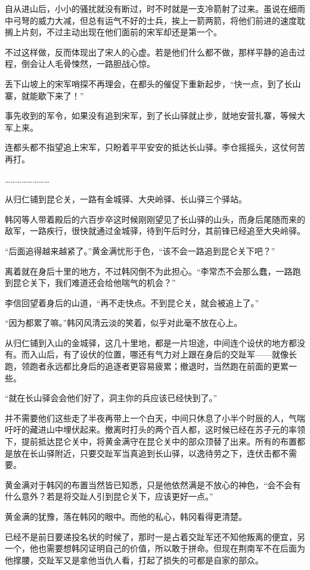 自从进山后，小小的骚扰就没有断过，时不时就是一支冷箭射了过来。虽说在细雨中弓弩的威力大减，但总有运气不好的士兵，挨上一箭两箭，将他们前进的速度耽搁上片刻，不过主动出现在他们面前的宋军却还是第一个。

不过这样做，反而体现出了宋人的心虚。若是他们什么都不做，那样平静的追击过程，倒会让人毛骨悚然，一路胆战心惊。

丢下山坡上的宋军哨探不再理会，在都头的催促下重新起步，“快一点，到了长山寨，就能歇下来了！”

事先收到的军令，如果没有追到宋军，到了长山驿就止步，就地安营扎寨，等候大军上来。

连都头都不指望追上宋军，只盼着平平安安的抵达长山驿。李仓摇摇头，这仗何苦再打。

……………………

从归仁铺到昆仑关，一路有金城驿、大央岭驿、长山驿三个驿站。

韩冈等人带着殿后的六百步卒这时候刚刚望见了长山驿的山头，而身后尾随而来的敌军，一路疾行，很快就通过金城驿，待到午后时分，其前锋已经追至大央岭驿。

“后面追得越来越紧了。”黄金满忧形于色，“该不会一路追到昆仑关下吧？”

离着就在身后十里的地方，不过韩冈倒不为此担心。“李常杰不会那么蠢，一路跑到昆仑关下，我们难道还会给他喘气的机会？”

李信回望着身后的山道，“再不走快点。不到昆仑关，就会被追上了。”

“因为都累了嘛。”韩冈风清云淡的笑着，似乎对此毫不放在心上。

从归仁铺到入山的金城驿，这几十里地，都是一片坦途，中间连个设伏的地方都没有。而入山后，有了设伏的位置，哪还有气力对上跟在身后的交趾军——就像长跑，领跑者永远都比身后的追逐者更容易疲累；撤退时，当然跑在前面的更累一些。

“就在长山驿会会他们好了，洞主你的兵应该已经快到了。”

并不需要他们这些走了半夜再带上一个白天，中间只休息了小半个时辰的人，气喘吁吁的藏进山中埋伏起来。撤离时打头的两个百人都，这时候已经在苏子元的率领下，提前抵达昆仑关中，将黄金满守在昆仑关中的部众顶替了出来。所有的布置都是放在长山驿附近，只要交趾军当真追到长山驿，以逸待劳之下，连伏击都不需要。

黄金满对于韩冈的布置当然皆已知悉，只是他依然满是不放心的神色，“会不会有什么意外？若是将交趾人引到昆仑关下，应该更好一点。”

黄金满的犹豫，落在韩冈的眼中。而他的私心，韩冈看得更清楚。

已经不是前日要递投名状的时候了，那时一是占着交趾军还不知他叛离的便宜，另一个，他也需要想韩冈证明自己的价值，所以敢于拼命。但现在荆南军不在后面为他撑腰，交趾军又是拿他当仇人看，打起了损失的可都是自家的部众。


